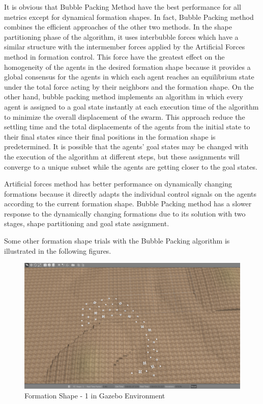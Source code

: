 It is obvious that Bubble Packing Method have the best performance for all metrics except for dynamical formation shapes. In fact, Bubble Packing method combines the efficient approaches of the other two methods. In the shape partitioning phase of the algorithm, it uses interbubble forces which have a similar structure with the intermember forces applied by the Artificial Forces method in formation control. This force have the greatest  effect on the homogeneity of the agents in the desired formation shape because it provides a global consensus for the agents in which each agent reaches an equilibrium state under the total force acting by their neighbors and the formation shape. On the other hand, bubble packing method implements an algorithm in which every agent is assigned to a goal state instantly at each execution time of the algorithm to minimize the overall displacement of the swarm. This approach reduce the settling time and the total displacements of the agents from the initial state to their final states since their final positions in the formation shape is predetermined. It is possible that the agents' goal states may be changed with the execution of the algorithm at different steps, but these assignments will converge to a unique subset while the agents are getting closer to the goal states. 

Artificial forces method has better performance on dynamically changing formations because it directly adapts the individual control signals on the agents according to the current formation shape. Bubble Packing method has a slower response to the dynamically changing formations due to its solution with two stages, shape partitioning and goal state assignment. 
		
Some other formation shape trials with the Bubble Packing algorithm is illustrated in the following figures.

\begin{figure}[H]
\caption{Formation Shape - 1 in Gazebo Environment}
\centerline{\includegraphics[scale = 0.35]{1_Gazebo}}
\end{figure} 
			
